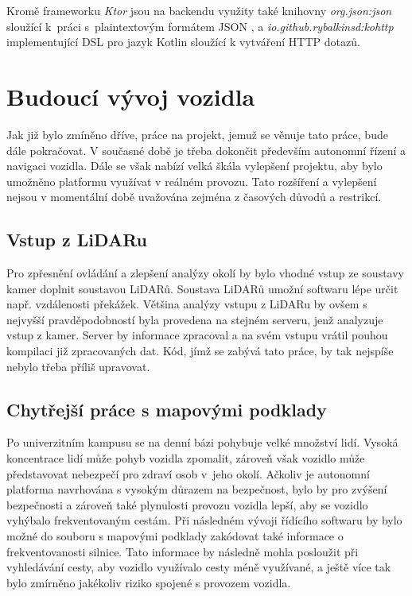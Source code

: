 \documentclass[czech, bachelor]{diploma}
\begin{document}
Kromě frameworku \emph{Ktor} jsou na backendu využity také knihovny \emph{org.json:json} \cite{jsonjava-source} sloužící k~práci
s~plaintextovým formátem JSON \cite{json-source}, a \emph{io.github.rybalkinsd:kohttp} \cite{kohttp-source} implementující DSL pro
jazyk Kotlin sloužící k vytváření HTTP dotazů.

\chapter{Budoucí vývoj vozidla}

Jak již bylo zmíněno dříve, práce na projekt, jemuž se věnuje tato práce, bude dále pokračovat. V současné době je třeba dokončit
především autonomní řízení a navigaci vozidla. Dále se však nabízí velká škála vylepšení projektu, aby bylo umožněno platformu
využívat v reálném provozu. Tato rozšíření a vylepšení nejsou v momentální době uvažována zejména z časových důvodů a restrikcí.

\section{Vstup z LiDARu}

Pro zpřesnění ovládání a zlepšení analýzy okolí by bylo vhodné vstup ze soustavy kamer doplnit soustavou LiDARů. Soustava LiDARů
umožní softwaru lépe určit např. vzdálenosti překážek. Většina analýzy vstupu z LiDARu by ovšem s nejvyšší pravděpodobností byla
provedena na stejném serveru, jenž analyzuje vstup z kamer. Server by informace zpracoval a na svém vstupu vrátil pouhou kompilaci
již zpracovaných dat. Kód, jímž se zabývá tato práce, by tak nejspíše nebylo třeba příliš upravovat.

\section{Chytřejší práce s mapovými podklady} \label{smarter-maps}

Po univerzitním kampusu se na denní bázi pohybuje velké množství lidí. Vysoká koncentrace lidí může pohyb vozidla zpomalit,
zároveň však vozidlo může představovat nebezpečí pro zdraví osob v~jeho okolí. Ačkoliv je autonomní platforma navrhována s vysokým
důrazem na bezpečnost, bylo by pro zvýšení bezpečnosti a zároveň také plynulosti provozu vozidla lepší, aby se vozidlo vyhýbalo
frekventovaným cestám. Při následném vývoji řídícího softwaru by bylo možné do souboru s mapovými podklady zakódovat také
informace o frekventovanosti silnice. Tato informace by následně mohla posloužit při vyhledávání cesty, aby vozidlo využívalo
cesty méně využívané, a ještě více tak bylo zmírněno jakékoliv riziko spojené s provozem vozidla.
\end{document}
